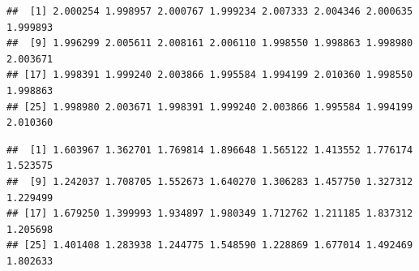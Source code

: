 \documentclass[
]{krantz}
\makeatletter
\newenvironment{Shaded}{\begin{snugshade}}{\end{snugshade}}
\newcommand{\CommentTok}[1]{\textcolor[rgb]{0.56,0.35,0.01}{\textit{#1}}}
\newcommand{\DataTypeTok}[1]{\textcolor[rgb]{0.13,0.29,0.53}{#1}}
\newcommand{\DecValTok}[1]{\textcolor[rgb]{0.00,0.00,0.81}{#1}}
\newcommand{\FloatTok}[1]{\textcolor[rgb]{0.00,0.00,0.81}{#1}}
\newcommand{\KeywordTok}[1]{\textcolor[rgb]{0.13,0.29,0.53}{\textbf{#1}}}
\newcommand{\NormalTok}[1]{#1}
\newcommand{\OperatorTok}[1]{\textcolor[rgb]{0.81,0.36,0.00}{\textbf{#1}}}
\newcommand{\StringTok}[1]{\textcolor[rgb]{0.31,0.60,0.02}{#1}}
\newenvironment{kframe}{%
\medskip{}
\setlength{\fboxsep}{.8em}
 \def\at@end@of@kframe{}%
 \ifinner\ifhmode%
  \def\at@end@of@kframe{\end{minipage}}%
  \begin{minipage}{\columnwidth}%
 \fi\fi%
 \def\FrameCommand##1{\hskip\@totalleftmargin \hskip-\fboxsep
 \colorbox{shadecolor}{##1}\hskip-\fboxsep
     \hskip-\linewidth \hskip-\@totalleftmargin \hskip\columnwidth}%
 \MakeFramed {\advance\hsize-\width
   \@totalleftmargin\z@ \linewidth\hsize
   \@setminipage}}%
 {\par\unskip\endMakeFramed%
 \at@end@of@kframe}
\renewenvironment{Shaded}{\begin{kframe}}{\end{kframe}}
\makeatother
\begin{document}
\begin{Shaded}
\end{Shaded}

\begin{verbatim}
##  [1] 2.000254 1.998957 2.000767 1.999234 2.007333 2.004346 2.000635 1.999893
##  [9] 1.996299 2.005611 2.008161 2.006110 1.998550 1.998863 1.998980 2.003671
## [17] 1.998391 1.999240 2.003866 1.995584 1.994199 2.010360 1.998550 1.998863
## [25] 1.998980 2.003671 1.998391 1.999240 2.003866 1.995584 1.994199 2.010360
\end{verbatim}

\begin{Shaded}
\end{Shaded}

\begin{verbatim}
##  [1] 1.603967 1.362701 1.769814 1.896648 1.565122 1.413552 1.776174 1.523575
##  [9] 1.242037 1.708705 1.552673 1.640270 1.306283 1.457750 1.327312 1.229499
## [17] 1.679250 1.399993 1.934897 1.980349 1.712762 1.211185 1.837312 1.205698
## [25] 1.401408 1.283938 1.244775 1.548590 1.228869 1.677014 1.492469 1.802633
\end{verbatim}
\end{document}
